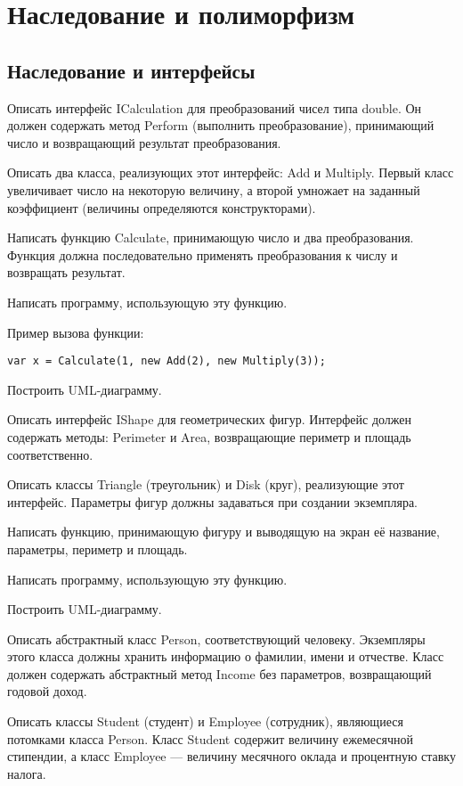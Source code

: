 \section{Наследование и полиморфизм}

\subsection{Наследование и интерфейсы}

\task Описать интерфейс ICalculation для преобразований чисел типа
double. Он должен содержать метод Perform (выполнить преобразование),
принимающий число и возвращающий результат преобразования.

Описать два класса, реализующих этот интерфейс: Add и Multiply. Первый
класс увеличивает число на некоторую величину, а второй умножает на
заданный коэффициент (величины определяются конструкторами).

Написать функцию Calculate, принимающую число и два
преобразования. Функция должна последовательно применять
преобразования к числу и возвращать результат.

Написать программу, использующую эту функцию.

Пример вызова функции:
\begin{lstlisting}[numbers=none]
var x = Calculate(1, new Add(2), new Multiply(3));
\end{lstlisting}

Построить UML-диаграмму.

\task Описать интерфейс IShape для геометрических фигур. Интерфейс
должен содержать методы: Perimeter и Area, возвращающие периметр и
площадь соответственно.

Описать классы Triangle (треугольник) и Disk (круг), реализующие этот
интерфейс. Параметры фигур должны задаваться при создании экземпляра.

Написать функцию, принимающую фигуру и выводящую на экран её название,
параметры, периметр и площадь.

Написать программу, использующую эту функцию.

Построить UML-диаграмму.

\task Описать абстрактный класс Person, соответствующий
человеку. Экземпляры этого класса должны хранить информацию о фамилии,
имени и отчестве. Класс должен содержать абстрактный метод Income без
параметров, возвращающий годовой доход.

Описать классы Student (студент) и Employee (сотрудник), являющиеся
потомками класса Person.  Класс Student содержит величину ежемесячной
стипендии, а класс Employee — величину месячного оклада и процентную
ставку налога.

